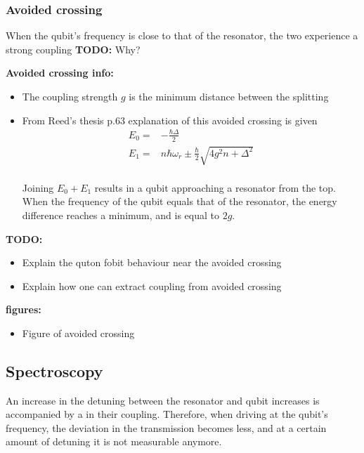 \documentclass[12pt]{report}
\begin{document}
        \subsubsection{Avoided crossing}
          When the qubit's frequency is close to that of the resonator, the two experience a strong coupling \textbf{TODO:} Why?

          \textbf{Avoided crossing info:}
          \begin{itemize}
             \item The coupling strength $g$ is the minimum distance between the splitting
             \item From Reed's thesis p.63 explanation of this avoided crossing is given\\
             \begin{align}
               E_0 = & -\frac{\hbar \Delta}{2}\\
               E_1 = & n \hbar\omega_r \pm \frac{\hbar}{2}\sqrt{4g^2n + \Delta^2}
             \end{align}\\
             Joining $E_0 + E_1$ results in a qubit approaching a resonator from the top.\\
             When the frequency of the qubit equals that of the resonator, the energy difference reaches a minimum, and is equal to $2g$.
           \end{itemize}
          \textbf{TODO:}
          \begin{itemize}
            \item Explain the quton fobit behaviour near the avoided crossing
            \item Explain how one can extract coupling from avoided crossing
          \end{itemize}

          \textbf{figures:}
          \begin{itemize}
            \item Figure of avoided crossing
          \end{itemize}

        \subsection{Spectroscopy}
          An increase in the detuning between the resonator and qubit increases is accompanied by a
           in their coupling. Therefore, when driving at the qubit's frequency, the deviation in the transmission becomes less, and at a certain amount of detuning it is not measurable anymore.
\end{document}

